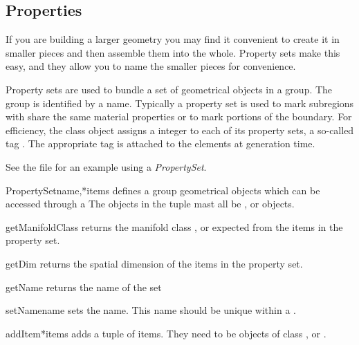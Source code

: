 \subsection{Properties}

If you are building a larger geometry you may find it convenient to
create it in smaller pieces and then assemble them into the whole. 
Property sets make this easy, and they allow you to name the smaller
pieces for convenience.

Property sets are used to bundle a set of geometrical objects in a
group.  The group is identified by a name.  Typically a property set
is used to mark subregions with share the same material properties or
to mark portions of the boundary.  For efficiency, the \Design class
object assigns a integer to each of its property sets, a so-called tag
.  The appropriate tag is attached to the elements at
generation time.

See the file  for an example using a {\it PropertySet}.


\begin{classdesc}{PropertySet}{name,*items}
defines a group geometrical objects which can be accessed through a 
The objects in the tuple  mast all be \ManifoldOneD, \ManifoldTwoD or \ManifoldThreeD objects.
\end{classdesc}


\begin{methoddesc}[PropertySet]{getManifoldClass}{}
returns the manifold class \ManifoldOneD, \ManifoldTwoD or \ManifoldThreeD expected from the items
in the property set.
\end{methoddesc}

\begin{methoddesc}[PropertySet]{getDim}{}
returns the spatial dimension of the items
in the property set. 
\end{methoddesc}

\begin{methoddesc}[PropertySet]{getName}{}
returns the name of the set
\end{methoddesc}

\begin{methoddesc}[PropertySet]{setName}{name}
sets the name. This name should be unique within a \Design.
\end{methoddesc}

\begin{methoddesc}[PropertySet]{addItem}{*items}
adds a tuple of items. They need to be objects of class \ManifoldOneD, \ManifoldTwoD or \ManifoldThreeD. 
\end{methoddesc}

